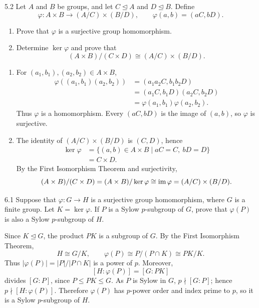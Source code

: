 \documentclass[11pt,oneside]{article}
\begin{document}
\begin{problem}{5.2}
Let $A$ and $B$ be groups, and let $C\trianglelefteq A$ and $D\trianglelefteq B$. Define
\[
\varphi\colon A\times B\longrightarrow(A/C)\times(B/D),
\qquad \varphi(a,b)=(aC,bD).
\]
\begin{enumerate}[label=(\alph*),leftmargin=2.5em,itemsep=0.2em,topsep=0.35em]
\item Prove that $\varphi$ is a surjective group homomorphism.
\item Determine $\ker\varphi$ and prove that
\[
(A\times B)/(C\times D)\cong(A/C)\times(B/D).
\]
\end{enumerate}
\end{problem}
\begin{solution}
\begin{enumerate}[label=(\alph*),leftmargin=2.5em,itemsep=0.55em,topsep=0.2em]
\item For $(a_1,b_1),(a_2,b_2)\in A\times B$,
\[
\begin{aligned}
\varphi((a_1,b_1)(a_2,b_2))
&=(a_1a_2C,b_1b_2D)\\
&=(a_1C,b_1D)(a_2C,b_2D)\\
&=\varphi(a_1,b_1)\varphi(a_2,b_2).
\end{aligned}
\]
Thus $\varphi$ is a homomorphism. Every $(aC,bD)$ is the image of $(a,b)$, so $\varphi$ is surjective.
\item The identity of $(A/C)\times(B/D)$ is $(C,D)$, hence
\[
\begin{aligned}
\ker\varphi
&=\{(a,b)\in A\times B\mid aC=C,\ bD=D\}\\
&=C\times D.
\end{aligned}
\]
By the First Isomorphism Theorem and surjectivity,
\[
(A\times B)/(C\times D)
=(A\times B)/\ker\varphi
\cong\operatorname{im}\varphi=(A/C)\times(B/D).
\]
\end{enumerate}
\end{solution}

\begin{problem}{6.1}
Suppose that $\varphi\colon G\to H$ is a surjective group homomorphism, where $G$ is a finite group. Let $K=\ker\varphi$. If $P$ is a Sylow $p$-subgroup of $G$, prove that $\varphi(P)$ is also a Sylow $p$-subgroup of $H$.
\end{problem}
\begin{solution}
Since $K\trianglelefteq G$, the product $PK$ is a subgroup of $G$. By the First Isomorphism Theorem,
\[
H\cong G/K,\qquad \varphi(P)\cong P/(P\cap K)\cong PK/K.
\]
Thus $|\varphi(P)|=|P|/|P\cap K|$ is a power of $p$. Moreover,
\[
[H:\varphi(P)]=[G:PK]
\]
divides $[G:P]$, since $P\le PK\le G$. As $P$ is Sylow in $G$, $p\nmid[G:P]$; hence $p\nmid[H:\varphi(P)]$. Therefore $\varphi(P)$ has $p$-power order and index prime to $p$, so it is a Sylow $p$-subgroup of $H$.
\end{solution}
\end{document}

